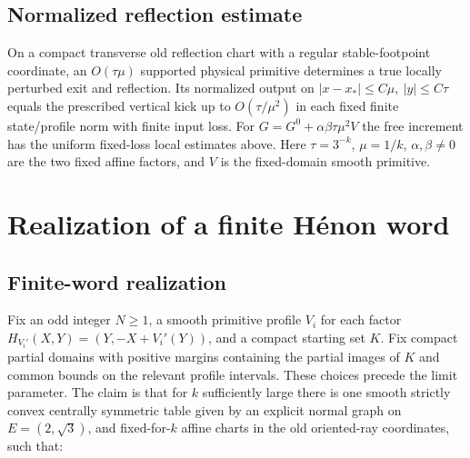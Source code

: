 \documentclass[11pt]{article}
\begin{document}
\subsection{Normalized reflection
estimate}\label{normalized-reflection-estimate}

On a compact transverse old reflection chart with a regular stable-footpoint
coordinate, an \(O(\tau\mu)\) supported physical primitive determines a true
locally perturbed exit and reflection. Its normalized output on
\(|x-x_*|\leq C\mu,\ |y|\leq C\tau\) equals the prescribed vertical kick up to
\(O(\tau/\mu^2)\) in each fixed finite state/profile norm with finite input
loss. For \(G=G^0+\alpha\beta\tau\mu^2 V\) the free increment has the uniform
fixed-loss local estimates above. Here \(\tau=3^{-k}\), \(\mu=1/k\),
\(\alpha,\beta\ne0\) are the two fixed affine factors, and \(V\) is the
fixed-domain smooth primitive.

\section{Realization of a finite Hénon word}\label{sec:word}

\subsection{Finite-word realization}\label{finite-word-realization}

Fix an odd integer \(N\ge1\), a smooth primitive profile \(V_i\) for each factor
\(H_{V_i'}(X,Y)=(Y,-X+V_i'(Y))\), and a compact starting set \(K\). Fix compact
partial domains with positive margins containing the partial images of \(K\) and
common bounds on the relevant profile intervals. These choices precede the limit
parameter. The claim is that for \(k\) sufficiently large there is one smooth
strictly convex centrally symmetric table given by an explicit normal graph on
\(E=(2,\sqrt3)\), and fixed-for-\(k\) affine charts in the old oriented-ray
coordinates, such that:
\end{document}
